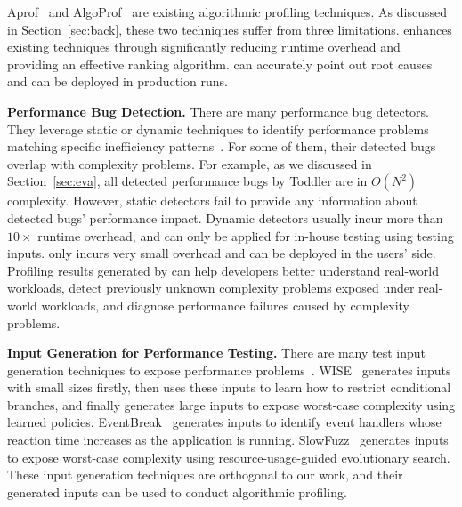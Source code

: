 Aprof~\cite{Aprof1, Aprof2} and AlgoProf~\cite{AlgoProf} are existing
algorithmic profiling techniques.
As discussed in Section~\ref{sec:back},
these two techniques suffer from three limitations. 
\Tool enhances existing techniques through significantly 
reducing runtime overhead and providing an effective ranking algorithm. 
\Tool can accurately point out root causes 
and can be deployed in production runs. 



\noindent\textbf{Performance Bug Detection.}
There are many performance bug detectors.
They leverage static or dynamic techniques to
identify performance problems matching specific inefficiency
patterns~\cite{yufei-perf,CLARITY,xiao13:context,PerfBug,Alabama,CARAMEL,XuDataStructure,XuBloatPLDI2009,XuBloatPLDI2010,Cachetor,LoopInvariant,falsesharing}.
For some of them, their detected bugs overlap with complexity problems.
For example, as we discussed in Section~\ref{sec:eva},
all detected performance bugs by Toddler are in $O(N^2)$ complexity.
However, static detectors fail to provide any information
about detected bugs' performance impact.
Dynamic detectors usually incur more than $10\times$ runtime overhead,
and can only be applied for in-house testing using testing inputs.
\Tool only incurs very small overhead and can be deployed in the users' side.
Profiling results generated by \Tool can help developers better
understand real-world workloads, 
detect previously unknown complexity problems exposed under real-world workloads, 
and diagnose performance failures caused by complexity problems.



\noindent\textbf{Input Generation for Performance Testing.}
There are many test input generation techniques to expose performance 
problems~\cite{WISE,EventBreak,slowfuzz}.
WISE~\cite{WISE} generates inputs with small sizes firstly,
then uses these inputs to learn how to restrict conditional branches,
and finally generates large inputs to expose worst-case complexity using learned policies.
EventBreak~\cite{EventBreak} generates inputs to identify
event handlers whose reaction time increases as the application is running.
SlowFuzz~\cite{slowfuzz} generates inputs to expose worst-case complexity using
resource-usage-guided evolutionary search.
These input generation techniques are orthogonal to our work,
and their generated inputs can be used to conduct algorithmic profiling.

